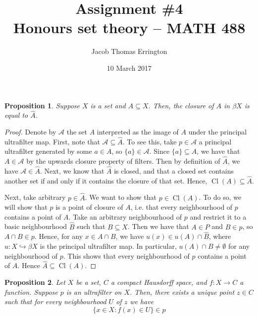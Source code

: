 \documentclass[11pt,letterpaper]{article}
\author{Jacob Thomas Errington}
\title{Assignment \#4\\Honours set theory -- MATH 488}
\date{10 March 2017}
\newtheorem{prop}{Proposition}
\newcommand{\parens}[1]{\left(#1\right)}
\newcommand{\intersn}{\cap}
\DeclareMathOperator{\closureOp}{Cl}
\newcommand{\closure}[1]{\closureOp{\parens{#1}}}
\newcommand{\embedsto}{\hookrightarrow}
\begin{document}
\maketitle

\begin{prop}
    Suppose $X$ is a set and $A \subseteq X$. Then, the closure of $A$ in
    $\beta X$ is equal to $\hat A$.
\end{prop}

\begin{proof}
    Denote by $\mathcal{A}$ the set $A$ interpreted as the image of $A$ under
    the principal ultrafilter map.
    First, note that $\mathcal{A} \subseteq \hat A$.
    To see this, take $p \in \mathcal{A}$ a principal ultrafilter generated by
    some $a \in A$, so $\{ a \} \in \mathcal{A}$. Since $\{a\} \subseteq A$, we
    have that $A \in \mathcal{A}$ by the upwards closure property of filters.
    Then by definition of $\hat A$, we have $\mathcal{A} \in \hat A$.
    Next, we know that $\hat A$ is closed, and that a closed set contains
    another set if and only if it contains the closure of that set.
    Hence, $\closure{A} \subseteq \hat A$.

    Next, take arbitrary $p \in \hat A$.
    We want to show that $p \in \closure{A}$.
    To do so, we will show that $p$ is a point of closure of $A$,
    i.e. that every neighbourhood of $p$ contains a point of $A$.
    Take an arbitrary neighbourhood of $p$ and restrict it to a basic
    neighbourhood $\hat B$ such that $B \subseteq X$.
    Then we have that $A \in P$ and $B \in p$, so $A \intersn B \in p$.
    Hence, for any $x \in A \intersn B$,
    we have $u(x) \in u(A) \intersn \hat B$,
    where $u : X \embedsto \beta X$ is the principal ultrafilter map.
    In particular, $u(A) \intersn B \neq \emptyset$ for any neighbourhood of
    $p$. This shows that every neighbourhood of $p$ contains a point of $A$.
    Hence $\hat A \subseteq \closure{A}$.
\end{proof}

\begin{prop}
    \label{prop:compact-hausdorff-continuous-extension}
    Let $X$ be a set, $C$ a compact Hausdorff space, and $f : X \to C$ a
    function. Suppose $p$ is an ultrafilter on $X$. Then, there exists a unique
    point $z \in C$ such that for every neighbourhood $U$ of $z$ we have
    \begin{equation*}
        \{ x \in X : f (x) \in U \} \in p
    \end{equation*}
\end{prop}
\end{document}
